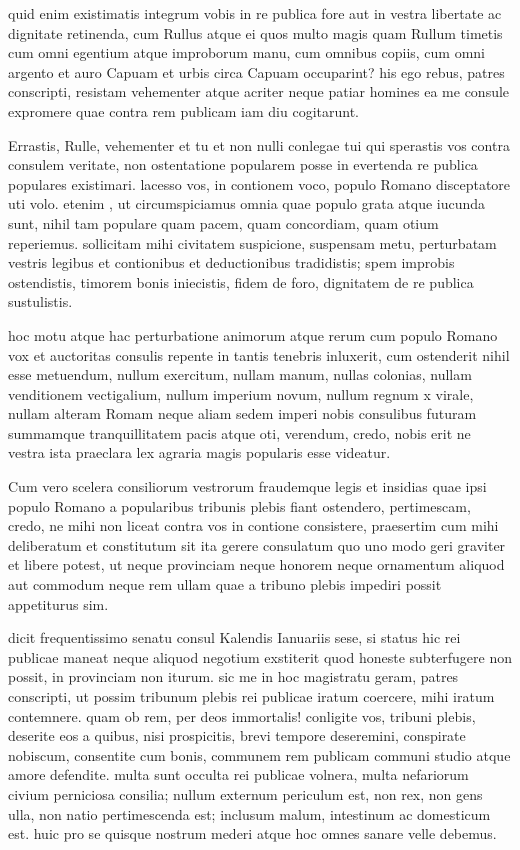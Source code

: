  quid enim existimatis integrum vobis in re publica fore aut in vestra libertate ac dignitate retinenda, cum Rullus atque ei quos multo magis quam Rullum timetis cum omni egentium atque improborum manu, cum omnibus copiis, cum omni argento et auro Capuam et urbis circa Capuam occuparint? his ego rebus, patres conscripti, resistam vehementer atque acriter neque patiar homines ea me consule expromere quae contra rem publicam iam diu cogitarunt.

 Errastis, Rulle, vehementer et tu et non nulli conlegae tui qui sperastis vos contra consulem veritate, non ostentatione popularem posse in evertenda re publica populares existimari. lacesso vos, in contionem voco, populo Romano disceptatore uti volo. etenim , ut circumspiciamus omnia quae populo grata atque iucunda sunt, nihil tam populare quam pacem, quam concordiam, quam otium reperiemus. sollicitam mihi civitatem suspicione, suspensam metu, perturbatam vestris legibus et contionibus et deductionibus tradidistis; spem improbis ostendistis, timorem bonis iniecistis, fidem de foro, dignitatem de re publica sustulistis.

 hoc motu atque hac perturbatione animorum atque rerum cum populo Romano vox et auctoritas consulis repente in tantis tenebris inluxerit, cum ostenderit nihil esse metuendum, nullum exercitum, nullam manum, nullas colonias, nullam venditionem vectigalium, nullum imperium novum, nullum regnum x virale, nullam alteram Romam neque aliam sedem imperi nobis consulibus futuram summamque tranquillitatem pacis atque oti, verendum, credo, nobis erit ne vestra ista praeclara lex agraria magis popularis esse videatur.

 Cum vero scelera consiliorum vestrorum fraudemque legis et insidias quae ipsi populo Romano a popularibus tribunis plebis fiant ostendero, pertimescam, credo, ne mihi non liceat contra vos in contione consistere, praesertim cum mihi deliberatum et constitutum sit ita gerere consulatum quo uno modo geri graviter et libere potest, ut neque provinciam neque honorem neque ornamentum aliquod aut commodum neque rem ullam quae a tribuno plebis impediri possit appetiturus sim.

 dicit frequentissimo senatu consul Kalendis Ianuariis sese, si status hic rei publicae maneat neque aliquod negotium exstiterit quod honeste subterfugere non possit, in provinciam non iturum. sic me in hoc magistratu geram, patres conscripti, ut possim tribunum plebis rei publicae iratum coercere, mihi iratum contemnere. quam ob rem, per deos immortalis! conligite vos, tribuni plebis, deserite eos a quibus, nisi prospicitis, brevi tempore deseremini, conspirate nobiscum, consentite cum bonis, communem rem publicam communi studio atque amore defendite. multa sunt occulta rei publicae volnera, multa nefariorum civium perniciosa consilia; nullum externum periculum est, non rex, non gens ulla, non natio pertimescenda est; inclusum malum, intestinum ac domesticum est. huic pro se quisque nostrum mederi atque hoc omnes sanare velle debemus.

